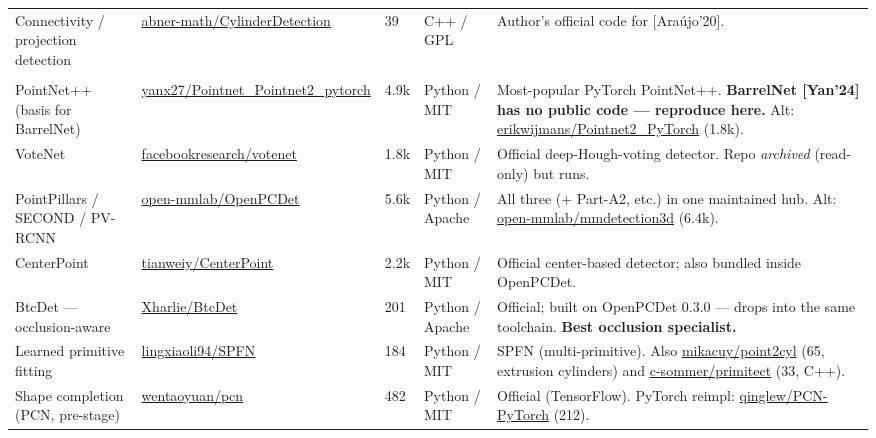 \documentclass[10pt,a4paper]{article}
\begin{document}
\begin{landscape}
\begin{longtable}{@{}R{3.5cm} R{5.0cm} R{1.2cm} R{2.7cm} R{9.6cm}@{}}
Connectivity / projection detection &
\href{https://github.com/abner-math/CylinderDetection}{abner-math/CylinderDetection} & 39 & C++ / GPL &
Author's official code for [Ara\'ujo'20].\\

\\
PointNet++ \,(basis for BarrelNet) &
\href{https://github.com/yanx27/Pointnet_Pointnet2_pytorch}{yanx27/Pointnet\_Pointnet2\_pytorch} & 4.9k & Python / MIT &
Most-popular PyTorch PointNet++. \textbf{BarrelNet [Yan'24] has no public code --- reproduce here.} Alt: \href{https://github.com/erikwijmans/Pointnet2_PyTorch}{erikwijmans/Pointnet2\_PyTorch} (1.8k).\\

VoteNet &
\href{https://github.com/facebookresearch/votenet}{facebookresearch/votenet} & 1.8k & Python / MIT &
Official deep-Hough-voting detector. Repo \emph{archived} (read-only) but runs.\\

PointPillars / SECOND / PV-RCNN &
\href{https://github.com/open-mmlab/OpenPCDet}{open-mmlab/OpenPCDet} & 5.6k & Python / Apache &
All three (+ Part-A2, etc.) in one maintained hub. Alt: \href{https://github.com/open-mmlab/mmdetection3d}{open-mmlab/mmdetection3d} (6.4k).\\

CenterPoint &
\href{https://github.com/tianweiy/CenterPoint}{tianweiy/CenterPoint} & 2.2k & Python / MIT &
Official center-based detector; also bundled inside OpenPCDet.\\

BtcDet --- occlusion-aware &
\href{https://github.com/Xharlie/BtcDet}{Xharlie/BtcDet} & 201 & Python / Apache &
Official; built on OpenPCDet 0.3.0 --- drops into the same toolchain. \textbf{Best occlusion specialist.}\\

Learned primitive fitting &
\href{https://github.com/lingxiaoli94/SPFN}{lingxiaoli94/SPFN} & 184 & Python / MIT &
SPFN (multi-primitive). Also \href{https://github.com/mikacuy/point2cyl}{mikacuy/point2cyl} (65, extrusion cylinders) and \href{https://github.com/c-sommer/primitect}{c-sommer/primitect} (33, C++).\\

Shape completion (PCN, pre-stage) &
\href{https://github.com/wentaoyuan/pcn}{wentaoyuan/pcn} & 482 & Python / MIT &
Official (TensorFlow). PyTorch reimpl: \href{https://github.com/qinglew/PCN-PyTorch}{qinglew/PCN-PyTorch} (212).\\


\end{longtable}
\end{landscape}
\end{document}
